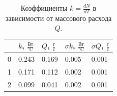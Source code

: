 \documentclass[12pt]{article}
\begin{document}
\begin{table}[H]
    \centering
    \begin{tabular}{|l|l|l|l|l|}
        \hline
          & $k$, $\frac{\textrm{Вт}}{\textrm{°C}}$ & $Q$, $\frac{\textrm{г}}{\textrm{с}}$ & $\sigma k$, $\frac{\textrm{Вт}}{\textrm{°C}}$ & $\sigma Q$, $\frac{\textrm{г}}{\textrm{с}}$ \\
        \hline
        0 & 0.243                                  & 0.169                                & 0.005                                         & 0.001                                       \\
        1 & 0.171                                  & 0.112                                & 0.002                                         & 0.001                                       \\
        2 & 0.099                                  & 0.041                                & 0.002                                         & 0.001                                       \\
        \hline
    \end{tabular}
    \caption{Коэффициенты $k = \frac{dN}{dT}$ в зависимости от массового расхода $Q$.}
    \label{tab:5}
\end{table}
\end{document}
